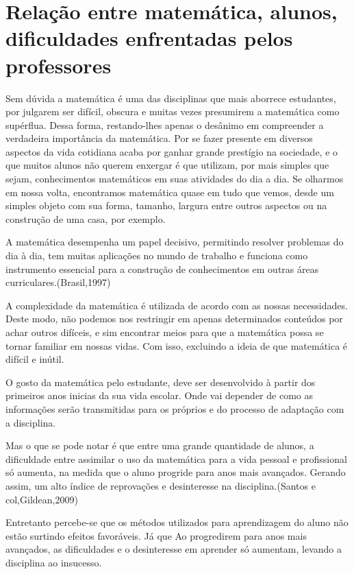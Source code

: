 \documentclass[12pt,a4paper]{article}
\begin{document}
\section{Relação entre matemática, alunos, dificuldades enfrentadas pelos professores}
Sem dúvida a matemática é uma das disciplinas que mais aborrece estudantes, por julgarem ser difícil, obscura e muitas vezes presumirem a matemática como supérflua. Dessa forma, restando-lhes apenas o desânimo em compreender a verdadeira importância da matemática. Por se fazer presente em diversos aspectos da vida cotidiana acaba por ganhar grande prestígio na sociedade, e o que muitos alunos não querem enxergar é que utilizam, por mais simples que sejam, conhecimentos matemáticos em suas atividades do dia a dia. Se olharmos em nossa volta, encontramos matemática quase em tudo que vemos, desde um simples objeto com sua forma, tamanho, largura entre outros aspectos ou na  construção de uma casa, por exemplo.

A matemática desempenha um papel decisivo, permitindo resolver problemas do dia à dia, tem muitas aplicações no mundo de trabalho e funciona como instrumento essencial para a construção de conhecimentos em outras áreas curriculares.(Brasil,1997)

A complexidade da matemática é utilizada de acordo com as nossas necessidades. Deste modo, não podemos nos restringir em apenas determinados conteúdos por achar outros difíceis, e sim encontrar meios para que a matemática possa se tornar familiar em nossas vidas. Com isso, excluindo a ideia de que matemática é difícil e inútil.

O gosto da matemática pelo estudante, deve ser desenvolvido à partir dos primeiros anos inicias da sua vida escolar. Onde vai depender de como as informações serão transmitidas para os próprios e  do processo de adaptação com a disciplina.

Mas o que se pode notar é que entre uma grande quantidade de alunos, a dificuldade entre assimilar o uso da matemática para a vida pessoal e profissional só aumenta, na medida que o aluno progride para anos mais avançados. Gerando assim, um alto índice de reprovações e desinteresse na disciplina.(Santos e col,Gildean,2009)

Entretanto percebe-se  que os métodos utilizados para aprendizagem do aluno não estão surtindo efeitos favoráveis. Já que Ao progredirem para anos mais avançados, as dificuldades e o desinteresse em aprender só aumentam, levando a disciplina ao insucesso. 
\end{document}
